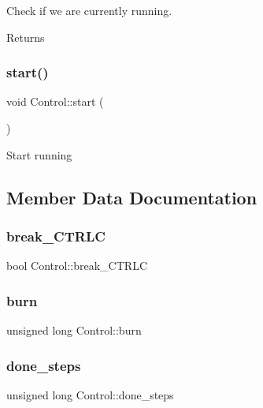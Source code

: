 Check if we are currently running. \begin{DoxyReturn}{Returns}

\end{DoxyReturn}
\mbox{\label{struct_control_a933994a3524f2f6d7ef0a17086e7cf66}} 
\subsubsection{\texorpdfstring{start()}{start()}}
{\footnotesize\ttfamily void Control\+::start (\begin{DoxyParamCaption}{ }\end{DoxyParamCaption})\hspace{0.3cm}{\ttfamily [inline]}}

Start running

\subsection{Member Data Documentation}
\mbox{\label{struct_control_a3a1856c582efd2a6a1b8f40351038d0c}} 
\subsubsection{\texorpdfstring{break\+\_\+\+C\+T\+R\+LC}{break\_CTRLC}}
{\footnotesize\ttfamily bool Control\+::break\+\_\+\+C\+T\+R\+LC}

\mbox{\label{struct_control_acb1e669784385d64b9f840674a3e08c1}} 
\subsubsection{\texorpdfstring{burn}{burn}}
{\footnotesize\ttfamily unsigned long Control\+::burn}

\mbox{\label{struct_control_a4a1867401c3e89aecaf14949521ed247}} 
\subsubsection{\texorpdfstring{done\+\_\+steps}{done\_steps}}
{\footnotesize\ttfamily unsigned long Control\+::done\+\_\+steps}

